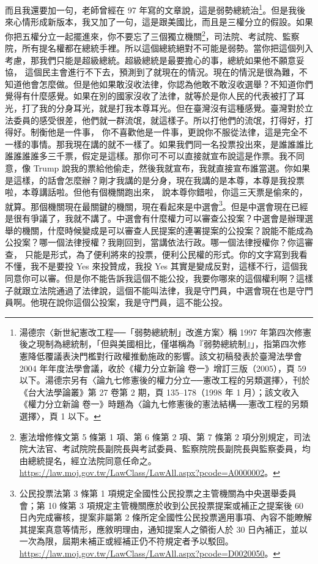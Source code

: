 \hypertarget{w05:cue:340}{}而且我還要加一句，老師曾經在 97 年寫的文章說，這是弱勢總統治\footnote{湯德宗〈新世紀憲改工程──「弱勢總統制」改進方案〉稱 1997 年第四次修憲後之現制為總統制，「但與美國相比，僅堪稱為『弱勢總統制』」，指第四次修憲降低覆議表決門檻對行政權推動施政的影響。該文初稿發表於臺灣法學會 2004 年年度法學會議，收於《權力分立新論 卷一》增訂三版（2005），頁 59 以下。湯德宗另有〈論九七修憲後的權力分立──憲改工程的另類選擇〉，刊於《台大法學論叢》第 27 卷第 2 期，頁 135–178（1998 年 1 月）；該文收入《權力分立新論 卷一》時題為〈論九七修憲後的憲法結構──憲改工程的另類選擇〉，頁 1 以下。}。但是我後來心情形成新版本，我又加了一句，這是跟美國比，而且是三權分立的假設。如果你把五權分立一起擺進來，你不要忘了三個獨立機關\footnote{憲法增修條文第 5 條第 1 項、第 6 條第 2 項、第 7 條第 2 項分別規定，司法院大法官、考試院院長副院長與考試委員、監察院院長副院長與監察委員，均由總統提名，經立法院同意任命之。\url{https://law.moj.gov.tw/LawClass/LawAll.aspx?pcode=A0000002}。}，司法院、考試院、監察院，所有提名權都在總統手裡。所以這個總統絕對不可能是弱勢。當你把這個列入考慮，那我們只能是超級總統。超級總統是最要擔心的事，總統如果他不願意妥協，
\hypertarget{w05:cue:341}{}這個民主會進行不下去，預測到了就現在的情況。現在的情況是很為難，不知道他會怎麼做。但是他如果敢沒收法律，你認為他敢不敢沒收選舉？不知道你們覺得有什麼感覺。如果在別的國家沒收了法律，就等於是你人民的代表被打了耳光，打了我的分身耳光，就是打我本尊耳光。但在臺灣沒有這種感覺。臺灣對於立法委員的感受很差，他們就一群流氓，就這樣子。所以打他們的流氓，打得好，打得好。制衡他是一件事，
\hypertarget{w05:cue:342}{}你不喜歡他是一件事，更說你不服從法律，這是完全不一樣的事情。那我現在講的就不一樣了。如果我們同一名投票投出來，是誰誰誰比誰誰誰誰多三千票，假定是這樣。那你可不可以直接就宣布說這是作票。我不同意，像 Trump 說我的票給他偷走，然後我就宣布，我就直接宣布誰當選。你如果是這樣，的話會怎麼辦？剛才我講的是分身，現在我講的是本尊，本尊是我投票啦，本尊講話啦。但他有個機關跑出來，
\hypertarget{w05:cue:343}{}說本尊你錯啦，你這三天票是偷來的，就算。那個機關現在最關鍵的機關，現在看起來是中選會\footnote{公民投票法第 3 條第 1 項規定全國性公民投票之主管機關為中央選舉委員會；第 10 條第 3 項規定主管機關應於收到公民投票提案或補正之提案後 60 日內完成審核，提案非屬第 2 條所定全國性公民投票適用事項、內容不能瞭解其提案真意等情形，應敘明理由，通知提案人之領銜人於 30 日內補正，並以一次為限，屆期未補正或經補正仍不符規定者予以駁回。\url{https://law.moj.gov.tw/LawClass/LawAll.aspx?pcode=D0020050}。}。但是中選會現在已經是很有爭議了，我就不講了。中選會有什麼權力可以審查公投案？中選會是辦理選舉的機關，什麼時候變成是可以審查人民提案的連署提案的公投案？說能不能成為公投案？哪一個法律授權？我剛回到，當講依法行政。哪一個法律授權你？你這審查，
\hypertarget{w05:cue:344}{}只能是形式，為了便利將來的投票，便利公民權的形式。你的文字寫到我看不懂，我不是要投 Yes 來投贊成，我投 Yes 其實是變成反對，這樣不行，這個我同意你可以審。但是你不能告訴我這個不能公投，我要你哪來的這個權利啊？這樣子就跟立法院通過了法律說，這個不能叫法律，我是守門員，中選會現在也是守門員啊。他現在說你這個公投案，我是守門員，這不能公投。

